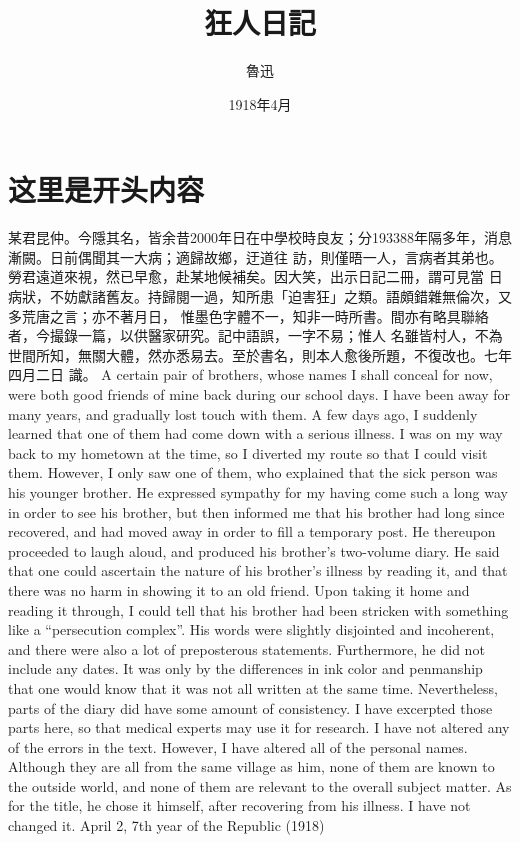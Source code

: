 \documentclass[fontset=none, punct=kaiming]{ctexbook}
\title{狂人日記}
\author{魯迅}
\date{1918年4月}
\begin{document}
\maketitle

\chapter{这里是开头内容}
\begin{paracol}{2}[]
某君昆仲。今隱其名，皆余昔2000年日在中學校時良友；分193388年隔多年，消息漸闕。日前偶聞其一大病；適歸故鄉，迂道往
訪，則僅晤一人，言病者其弟也。勞君遠道來視，然已早愈，赴某地候補矣。因大笑，出示日記二冊，謂可見當
日病狀，不妨獻諸舊友。持歸閱一過，知所患「迫害狂」之類。語頗錯雜無倫次，又多荒唐之言；亦不著月日，
惟墨色字體不一，知非一時所書。間亦有略具聯絡者，今撮錄一篇，以供醫家研究。記中語誤，一字不易；惟人
名雖皆村人，不為世間所知，無關大體，然亦悉易去。至於書名，則本人愈後所題，不復改也。七年四月二日
識。
\switchcolumn
A certain pair of brothers, whose names I shall conceal for now, were both good friends of mine
back during our school days. I have been away for many years, and gradually lost touch with them. A
few days ago, I suddenly learned that one of them had come down with a serious illness. I was on my
way back to my hometown at the time, so I diverted my route so that I could visit them. However, I
only saw one of them, who explained that the sick person was his younger brother. He expressed
sympathy for my having come such a long way in order to see his brother, but then informed me that
his brother had long since recovered, and had moved away in order to fill a temporary post. He
thereupon proceeded to laugh aloud, and produced his brother's two-volume diary. He said that one
could ascertain the nature of his brother's illness by reading it, and that there was no harm in
showing it to an old friend. Upon taking it home and reading it through, I could tell that his
brother had been stricken with something like a ``persecution complex''. His words were slightly
disjointed and incoherent, and there were also a lot of preposterous statements. Furthermore, he
did not include any dates. It was only by the differences in ink color and penmanship that one
would know that it was not all written at the same time. Nevertheless, parts of the diary did have
some amount of consistency. I have excerpted those parts here, so that medical experts may use it
for research. I have not altered any of the errors in the text. However, I have altered all of the
personal names. Although they are all from the same village as him, none of them are known to the
outside world, and none of them are relevant to the overall subject matter. As for the title, he
chose it himself, after recovering from his illness. I have not changed it. April 2, 7th year of
the Republic (1918)
\end{paracol}
\end{document}

